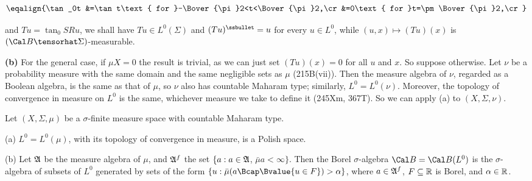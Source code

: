 {$$\eqalign{\tan_0t
&=\tan t\text{ for }-\Bover{\pi}2<t<\Bover{\pi}2,\cr
&=0\text{ for }t=\pm\Bover{\pi}2,\cr}$$

\noindent and $Tu=\tan_0SRu$, we shall have $Tu\in L^0(\Sigma)$ and
$(Tu)^{\ssbullet}=u$ for every
$u\in L^0$, while $(u,x)\mapsto(Tu)(x)$ is
$(\Cal B\tensorhat\Sigma)$-measurable.

\medskip

{\bf (b)} For the general case, if $\mu X=0$ the result is trivial,
as we can just set
$(Tu)(x)=0$ for all $u$ and $x$.   So suppose otherwise.   Let
$\nu$ be a probability measure with the same domain and the same negligible
sets as $\mu$ (215B(vii)).   Then the measure algebra of $\nu$, regarded as a
Boolean algebra, is the same as that of $\mu$, so
$\nu$ also has countable Maharam type;  similarly,
$L^0=L^0(\nu)$.   Moreover, the topology of convergence in measure on $L^0$
is the same, whichever measure we take to define it (245Xm, 367T).
So we can apply (a) to $(X,\Sigma,\nu)$.
}%

Let $(X,\Sigma,\mu)$ be a $\sigma$-finite measure
space with countable Maharam type.

(a) $L^0=L^0(\mu)$, with its topology of convergence in measure,
is a Polish space.

(b) Let $\frak A$ be the measure algebra
of $\mu$, and $\frak A^f$ the set $\{a:a\in\frak A$, $\bar\mu a<\infty\}$.
Then the Borel $\sigma$-algebra $\Cal B=\Cal B(L^0)$
is the $\sigma$-algebra
of subsets of $L^0$ generated by sets of the form
$\{u:\bar\mu(a\Bcap\Bvalue{u\in F})>\alpha\}$,
where $a\in\frak A^f$, $F\subseteq\Bbb R$ is Borel, and
$\alpha\in\Bbb R$.

